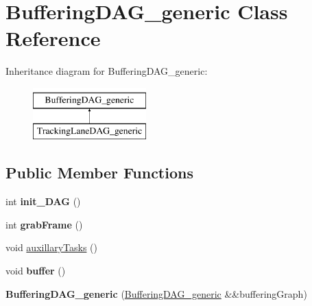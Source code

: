 \hypertarget{classBufferingDAG__generic}{\section{Buffering\-D\-A\-G\-\_\-generic Class Reference}
\label{classBufferingDAG__generic}
}
Inheritance diagram for Buffering\-D\-A\-G\-\_\-generic\-:\begin{figure}[H]
\begin{center}
\leavevmode
\includegraphics[height=2.000000cm]{classBufferingDAG__generic}
\end{center}
\end{figure}
\subsection*{Public Member Functions}
\begin{DoxyCompactItemize}
\item 
\hypertarget{classBufferingDAG__generic_a3302080dd65ec70f5ac068aa47ace57f}{int {\bfseries init\-\_\-\-D\-A\-G} ()}\label{classBufferingDAG__generic_a3302080dd65ec70f5ac068aa47ace57f}

\item 
\hypertarget{classBufferingDAG__generic_a0e1ee4f8a694fd0fdf2b9893944929e8}{int {\bfseries grab\-Frame} ()}\label{classBufferingDAG__generic_a0e1ee4f8a694fd0fdf2b9893944929e8}

\item 
void \hyperlink{classBufferingDAG__generic_a7d58d28db3981dac7aaed4b1badb5d88}{auxillary\-Tasks} ()
\item 
\hypertarget{classBufferingDAG__generic_a34a33f6c25ab56c002bb4cd67a9c990c}{void {\bfseries buffer} ()}\label{classBufferingDAG__generic_a34a33f6c25ab56c002bb4cd67a9c990c}

\item 
\hypertarget{classBufferingDAG__generic_a06d2690141f61dec3a1c55fb28d52d22}{{\bfseries Buffering\-D\-A\-G\-\_\-generic} (\hyperlink{classBufferingDAG__generic}{Buffering\-D\-A\-G\-\_\-generic} \&\&buffering\-Graph)}\label{classBufferingDAG__generic_a06d2690141f61dec3a1c55fb28d52d22}

\end{DoxyCompactItemize}
